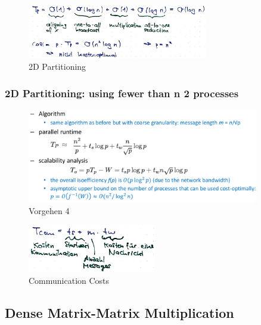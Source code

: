 \begin{figure}[H]
\centering
\includegraphics[width=0.7\textwidth]{figures/matrix-mult-2DPartitioning.png}
\caption{2D Partitioning}
\end{figure}
\clearpage

\hypertarget{d-partitioning-using-fewer-than-n-2-processes}{%
\subsubsection{2D Partitioning: using fewer than n 2
processes}\label{d-partitioning-using-fewer-than-n-2-processes}}

\begin{figure}[H]
\centering
\includegraphics[width=0.9\textwidth]{figures/matrixVectorMulitplication4.png}
\caption{Vorgehen 4}
\end{figure}

\begin{figure}[H]
\centering
\includegraphics[width=0.5\textwidth]{figures/matrix-mult-comm-costs.png}
\caption{Communication Costs}
\end{figure}

\hypertarget{dense-matrix-matrix-multiplication}{%
\subsection{Dense Matrix-Matrix
Multiplication}\label{dense-matrix-matrix-multiplication}}

